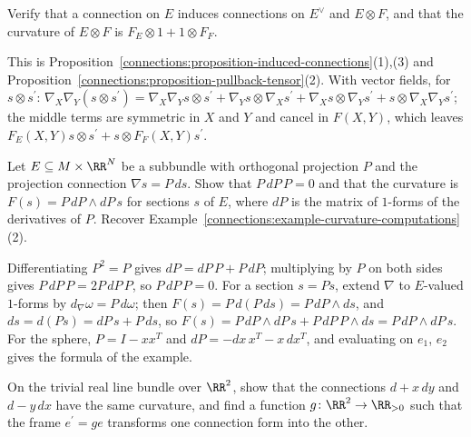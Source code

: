 \begin{exercise}\label{connections:exercise-induced-connections}
Verify that a connection on $E$ induces connections on $E^\vee$ and $E \otimes F$, and that the curvature of $E \otimes F$ is $F_E \otimes 1 + 1 \otimes F_F$.
\end{exercise}

\begin{solution}
This is Proposition~\ref{connections:proposition-induced-connections}(1),(3) and Proposition~\ref{connections:proposition-pullback-tensor}(2). With vector fields, for
$s \otimes s^{\prime}$: $\nabla_X\nabla_Y(s \otimes s^{\prime}) = \nabla_X\nabla_Ys \otimes s^{\prime} + \nabla_Ys \otimes \nabla_Xs^{\prime} + \nabla_Xs \otimes \nabla_Ys^{\prime} + s \otimes \nabla_X\nabla_Ys^{\prime}$; the
middle terms are symmetric in $X$ and $Y$ and cancel in $F(X, Y)$, which leaves $F_E(X, Y)s \otimes s^{\prime} + s \otimes F_F(X, Y)s^{\prime}$.
\end{solution}

\begin{exercise}\label{connections:exercise-projection-curvature}
Let $E \subseteq M \times \RR^N$ be a subbundle with orthogonal projection $P$ and the projection connection $\nabla s = P\,ds$. Show that $P\,dP\,P = 0$ and that the curvature is
$F(s) = P\,dP \wedge dP\,s$ for sections $s$ of $E$, where $dP$ is the matrix of $1$-forms of the derivatives of $P$. Recover Example~\ref{connections:example-curvature-computations}(2).
\end{exercise}

\begin{solution}
Differentiating $P^2 = P$ gives $dP = dP\,P + P\,dP$; multiplying by $P$ on both sides gives $P\,dP\,P = 2P\,dP\,P$, so $P\,dP\,P = 0$. For a section $s = Ps$, extend $\nabla$ to
$E$-valued $1$-forms by $d_\nabla\omega = P\,d\omega$; then $F(s) = P\,d(P\,ds) = P\,dP \wedge ds$, and $ds = d(Ps) = dP\,s + P\,ds$, so
$F(s) = P\,dP \wedge dP\,s + P\,dP\,P \wedge ds = P\,dP \wedge dP\,s$. For the sphere, $P = I - xx^T$ and $dP = -dx\,x^T - x\,dx^T$, and evaluating on $e_1$, $e_2$ gives the
formula of the example.
\end{solution}

\begin{exercise}\label{connections:exercise-gauge-plane}
On the trivial real line bundle over $\RR^2$, show that the connections $d + x\,dy$ and $d - y\,dx$ have the same curvature, and find a function $g \colon \RR^2 \to \RR_{>0}$
such that the frame $e^{\prime} = ge$ transforms one connection form into the other.
\end{exercise}

